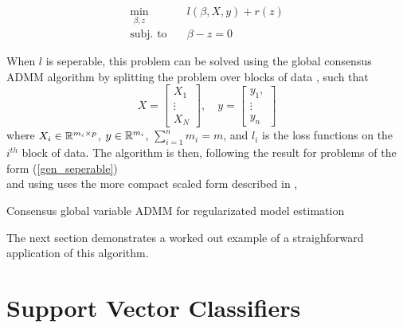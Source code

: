 \documentclass[11pt]{article}
\begin{document}
\begin{equation}
\begin{aligned}
    \min_{\beta, z} \quad & {l(\beta, X, y) + r(z)} \\
    \textrm{subj. to} \quad & \beta - z = 0
\end{aligned}
\end{equation}

When $l$ is seperable, this problem can be solved using the global consensus ADMM algorithm by splitting
the problem over blocks of data \cite{boydistributed}, such that
\[
    X = \begin{bmatrix} X_1 \\ \vdots \\ X_N \end{bmatrix}, \quad
    y = \begin{bmatrix} y_1, \\ \vdots \\ y_n\end{bmatrix}
\]
where $X_i \in \mathbb{R}^{m_i \times p}$, $y \in \mathbb{R}^{m_i}$, $\sum_{i=1}^n m_i = m$, and $l_i$ is 
the loss functions on the $i^{th}$ block of data.
The algorithm is then, following the result for problems of the form (\ref{gen_seperable}) \\
and using uses the more compact scaled form described in \cite{boydistributed},\\

\begin{algorithm}[H]
    \caption{Consensus global variable ADMM for regularizated model estimation}

    \SetAlgoNoLine

\end{algorithm}
\vspace{5pt}
The next section demonstrates a worked out example of a straighforward application of this algorithm.

\section{Support Vector Classifiers}
\end{document}

